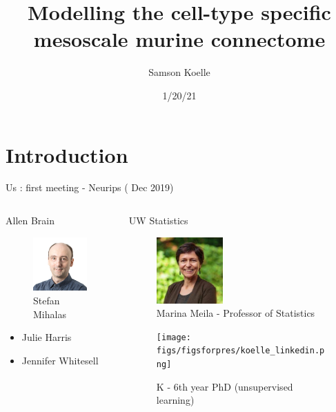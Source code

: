 \documentclass{beamer}
\title[Modelling the cell-type specific murine connectome]{Modelling the cell-type specific mesoscale murine connectome}
\author{Samson Koelle}
\institute{Allen / UW Department of Statistics}
\date{1/20/21}
\begin{document}
\begin{frame}
  \titlepage
\end{frame}


\section{Introduction}

\begin{frame}{Us : first meeting - Neurips ( Dec 2019)}
\begin{columns}
\begin{column}{0.33\textwidth}
Allen Brain
\begin{figure}
    \centering
    \includegraphics[width = 1.2in]{figs/figsforpres/stefan.jpg}
    \caption{Stefan Mihalas}
\end{figure}
\begin{itemize}
    \item Julie Harris
    \item Jennifer Whitesell
\end{itemize}

\end{column}
\begin{column}{.33\textwidth}
UW Statistics
\begin{figure}
    \centering
    \includegraphics[width = 1in]{figs/figsforpres/meila.jpeg}
    \caption{Marina Meila - Professor of Statistics}
\end{figure}

\begin{figure}
    \centering
    \texttt{[image: figs/figsforpres/koelle\_linkedin.png]}
    \caption{K - 6th year PhD  (unsupervised learning)}
\end{figure}
\end{column}
\end{columns}
\end{frame}
\end{document}
